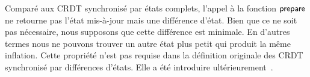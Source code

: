 Comparé aux \ac{CRDT} synchronisé par états complets, l'appel à la fonction $\operatorname{\mathsf{prepare}}$ ne retourne pas l'état mis-à-jour mais une différence d'état.
Bien que ce ne soit pas nécessaire, nous supposons que cette différence est minimale.
En d'autres termes nous ne pouvons trouver un autre état plus petit qui produit la même inflation.
Cette propriété n'est pas requise dans la définition originale des \ac{CRDT} synchronisé par différences d'états.
Elle a été introduire ultérieurement~\autocite{enes_2018_efficient-sync-state-based-crdt}.


